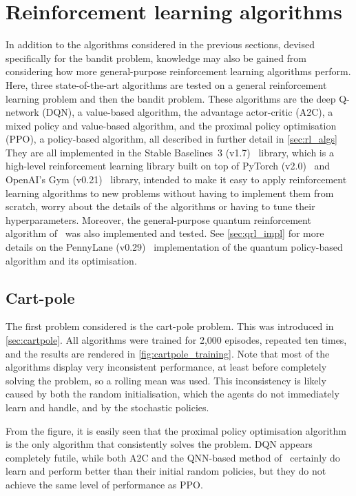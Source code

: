 \section{Reinforcement learning algorithms}
\label{sec:sim_rl}

In addition to the algorithms considered in the previous sections, devised specifically for the bandit problem, knowledge may also be gained from considering how more general-purpose reinforcement learning algorithms perform.
Here, three state-of-the-art algorithms are tested on a general reinforcement learning problem and then the bandit problem.
These algorithms are the deep Q-network (DQN), a value-based algorithm, the advantage actor-critic (A2C), a mixed policy and value-based algorithm, and the proximal policy optimisation (PPO), a policy-based algorithm, all described in further detail in \cref{sec:rl_algs}
They are all implemented in the Stable Baselines~3 (v1.7)~\autocite{sb3} library, which is a high-level reinforcement learning library built on top of PyTorch (v2.0)~\autocite{pytorch} and OpenAI's Gym (v0.21)~\autocite{gym} library, intended to make it easy to apply reinforcement learning algorithms to new problems without having to implement them from scratch, worry about the details of the algorithms or having to tune their hyperparameters.
Moreover, the general-purpose quantum reinforcement algorithm of~\autocite{jerbi2021} was also implemented and tested.
See \cref{sec:qrl_impl} for more details on the PennyLane (v0.29)~\autocite{pennylane} implementation of the quantum policy-based algorithm and its optimisation.

\subsection{Cart-pole}
\label{sec:sim_rl_cartpole}

The first problem considered is the cart-pole problem.
This was introduced in \cref{sec:cartpole}.
All algorithms were trained for 2,000 episodes, repeated ten times, and the results are rendered in \cref{fig:cartpole_training}.
Note that most of the algorithms display very inconsistent performance, at least before completely solving the problem, so a rolling mean was used.
This inconsistency is likely caused by both the random initialisation, which the agents do not immediately learn and handle, and by the stochastic policies.

From the figure, it is easily seen that the proximal policy optimisation algorithm is the only algorithm that consistently solves the problem.
DQN appears completely futile, while both A2C and the QNN-based method of~\autocite{jerbi2021} certainly do learn and perform better than their initial random policies, but they do not achieve the same level of performance as PPO.


